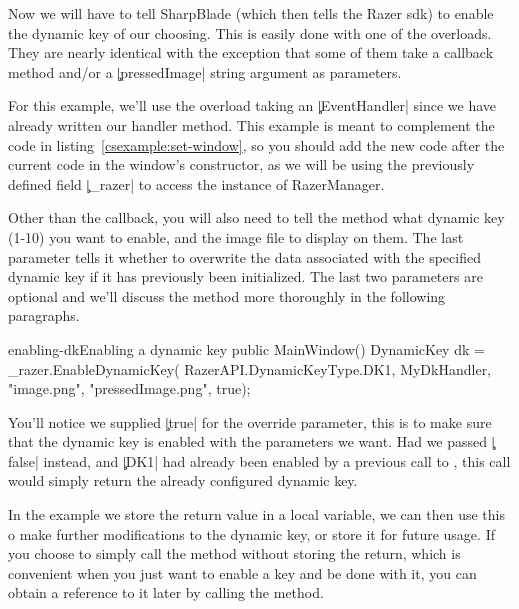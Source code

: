 Now we will have to tell SharpBlade (which then tells the Razer \gls{sdk}) to enable the dynamic key of our choosing. This is easily done with one of the  overloads. They are nearly identical with the exception that some of them take a callback method and/or a \c|pressedImage| string argument as parameters.

For this example, we'll use the overload taking an \c|EventHandler| since we have already written our handler method. This example is meant to complement the code in listing~\ref{csexample:set-window}, so you should add the new code after the current code in the window's constructor, as we will be using the previously defined field \c|_razer| to access the instance of RazerManager.

Other than the callback, you will also need to tell the method what dynamic key (1-10) you want to enable, and the image file to display on them. The last parameter tells it whether to overwrite the data associated with the specified dynamic key if it has previously been initialized. The last two parameters are optional and we'll discuss the method more thoroughly in the following paragraphs.

\begin{csexample}{enabling-dk}{Enabling a dynamic key}
public MainWindow()
{
    DynamicKey dk = _razer.EnableDynamicKey(
        RazerAPI.DynamicKeyType.DK1,
        MyDkHandler,
        "image.png",
        "pressedImage.png",
        true);
}
\end{csexample}

You'll notice we supplied \c|true| for the override parameter, this is to make sure that the dynamic key is enabled with the parameters we want. Had we passed \c|false| instead, and \c|DK1| had already been enabled by a previous call to , this call would simply return the already configured dynamic key.

In the example we store the return value in a local variable, we can then use this o make further modifications to the dynamic key, or store it for future usage. If you choose to simply call the method without storing the return, which is convenient when you just want to enable a key and be done with it, you can obtain a reference to it later by calling the  method.

